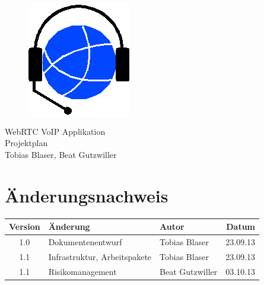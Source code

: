 \documentclass[ngerman,a4paper,12pt]{scrreprt}
\title{\documentType \project}
\author{Tobias Blaser, Beat Gutzwiller}
\date{\today{}, Rapperswil}
\providecommand{\project}{WebRTC VoIP Applikation}
\providecommand{\documentType}{Projektplan}
\begin{document}
\thispagestyle{empty}
\begin{titlepage}
	\begin{center}

	\vspace*{40mm}
	
	\begin{figure}[htp]
		\centering
		\includegraphics[scale=0.60]{../img/icon-js-voip.png}
	\end{figure}		
	\vspace*{20mm}
	
	{\fontsize{40}{48} \selectfont \project \\[10mm]}
	{\fontsize{40}{48} \selectfont \documentType \\[5mm]}	
	\vspace*{20mm}
	Tobias Blaser, Beat Gutzwiller

\end{center}
\end{titlepage}
\clearpage

\chapter*{Änderungsnachweis}
\begin{tabularx}{\textwidth}{|cXlr|} %
		\hline
		\textbf{Version} & \textbf{Änderung} & \textbf{Autor} & \textbf{Datum}\\
		\hline
		1.0 & Dokumentenentwurf & Tobias Blaser & 23.09.13\\
		1.1 & Infrastruktur, Arbeitspakete & Tobias Blaser & 23.09.13\\
		1.1 & Risikomanagement & Beat Gutzwiller & 03.10.13\\
		\hline
\end{tabularx}

\tableofcontents






\end{document}
